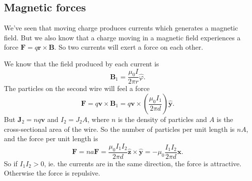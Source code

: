 \documentclass[a4paper]{article}
\begin{document}
\subsection{Magnetic forces}
We've seen that moving charge produces currents which generates a magnetic field. But we also know that a charge moving in a magnetic field experiences a force $\mathbf{F} = q\mathbf{r}\times \mathbf{B}$. So two currents will exert a force on each other.

\begin{eg}\leavevmode
  \begin{center}
  \end{center}
  We know that the field produced by each current is
  \[
    \mathbf{B}_1 = \frac{\mu_0 I}{2\pi r}\hat{\varphi}.
  \]
  The particles on the second wire will feel a force
  \[
    \mathbf{F} = q\mathbf{v}\times \mathbf{B}_1 = q\mathbf{v}\times \left(\frac{\mu_0 I_1}{2\pi d}\right) \hat{\mathbf{y}}.
  \]
  But $\mathbf{J}_2 = nq\mathbf{v}$ and $I_2 = J_2 A$, where $n$ is the density of particles and $A$ is the cross-sectional area of the wire. So the number of particles per unit length is $nA$, and the force per unit length is
  \[
    \mathbf{F} = na\mathbf{F} = \frac{\mu_0 I_1I_2}{2\pi d}\hat{\mathbf{z}}\times \hat{\mathbf{y}} = -\mu_0\frac{I_1I_2}{2\pi d}\hat{\mathbf{x}}.
  \]
  So if $I_1I_2 > 0$, ie. the currents are in the same direction, the force is attractive. Otherwise the force is repulsive.
\end{eg}
\end{document}
